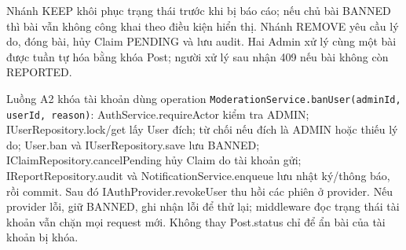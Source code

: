 Nhánh KEEP khôi phục trạng thái trước khi bị báo cáo; nếu chủ bài BANNED thì bài vẫn không công khai theo điều kiện hiển thị. Nhánh REMOVE yêu cầu lý do, đóng bài, hủy Claim PENDING và lưu audit. Hai Admin xử lý cùng một bài được tuần tự hóa bằng khóa Post; người xử lý sau nhận 409 nếu bài không còn REPORTED.


Luồng A2 khóa tài khoản dùng operation \texttt{ModerationService.banUser(adminId, userId, reason)}: AuthService.requireActor kiểm tra ADMIN; IUserRepository.lock/get lấy User đích; từ chối nếu đích là ADMIN hoặc thiếu lý do; User.ban và IUserRepository.save lưu BANNED; IClaimRepository.cancelPending hủy Claim do tài khoản gửi; IReportRepository.audit và NotificationService.enqueue lưu nhật ký/thông báo, rồi commit. Sau đó IAuthProvider.revokeUser thu hồi các phiên ở provider. Nếu provider lỗi, giữ BANNED, ghi nhận lỗi để thử lại; middleware đọc trạng thái tài khoản vẫn chặn mọi request mới. Không thay Post.status chỉ để ẩn bài của tài khoản bị khóa.
